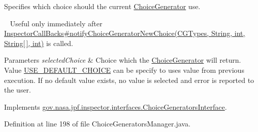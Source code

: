 Specifies which choice should the current \hyperlink{}{Choice\+Generator} use. 

~\newline
Useful only immediately after \hyperlink{}{Inspector\+Call\+Backs\#notify\+Choice\+Generator\+New\+Choice(\+C\+G\+Types, String, int, String\mbox{[}$\,$\mbox{]}, int)} is called.


\begin{DoxyParams}{Parameters}
{\em selected\+Choice} & Choice which the \hyperlink{}{Choice\+Generator} will return. Value \hyperlink{interfacegov_1_1nasa_1_1jpf_1_1inspector_1_1interfaces_1_1_choice_generators_interface_ac57a2bb0eb101be2c2b27bd19cb81ea7}{U\+S\+E\+\_\+\+D\+E\+F\+A\+U\+L\+T\+\_\+\+C\+H\+O\+I\+CE} can be specify to uses value from previous execution. If no default value exists, no value is selected and error is reported to the user. \\
\hline
\end{DoxyParams}


Implements \hyperlink{interfacegov_1_1nasa_1_1jpf_1_1inspector_1_1interfaces_1_1_choice_generators_interface_a055b8d48f863633614dee147bc607ed7}{gov.\+nasa.\+jpf.\+inspector.\+interfaces.\+Choice\+Generators\+Interface}.



Definition at line 198 of file Choice\+Generators\+Manager.\+java.


